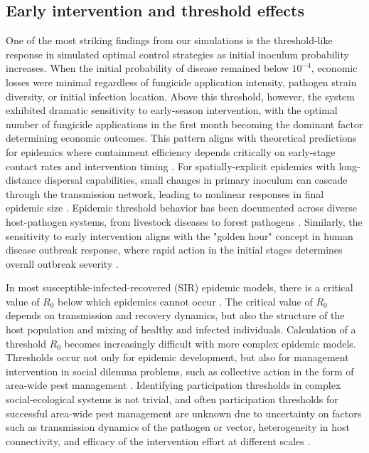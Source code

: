 \documentclass[10pt,a4paper]{article}
\begin{document}
\subsection{Early intervention and threshold effects}

One of the most striking findings from our simulations is the threshold-like response in simulated optimal control strategies as initial inoculum probability increases. When the initial probability of disease remained below $10^{-4}$, economic losses were minimal regardless of fungicide application intensity, pathogen strain diversity, or initial infection location. Above this threshold, however, the system exhibited dramatic sensitivity to early-season intervention, with the optimal number of fungicide applications in the first month becoming the dominant factor determining economic outcomes. This pattern aligns with theoretical predictions for epidemics where containment efficiency depends critically on early-stage contact rates and intervention timing \parencite{Margosian2009, Severns2019}. For spatially-explicit epidemics with long-distance dispersal capabilities, small changes in primary inoculum can cascade through the transmission network, leading to nonlinear responses in final epidemic size \parencite{Cunniffe2015}. Epidemic threshold behavior has been documented across diverse host-pathogen systems, from livestock diseases \parencite{Hartfield2013} to forest pathogens \parencite{Lofgren2014}. Similarly, the sensitivity to early intervention aligns with the "golden hour" concept in human disease outbreak response, where rapid action in the initial stages determines overall outbreak severity \parencite{Fraser2004}.

In most susceptible-infected-recovered (SIR) epidemic models, there is a critical value of $R_0$ below which epidemics cannot occur \parencite{Keeling2007, Diekmann2008}. The critical value of $R_0$ depends on transmission and recovery dynamics, but also the structure of the host population and mixing of healthy and infected individuals. Calculation of a threshold $R_0$ becomes increasingly difficult with more complex epidemic models. Thresholds occur not only for epidemic development, but also for management intervention in social dilemma problems, such as collective action in the form of area-wide pest management \parencite{Lence2022, Garcia-Figuera2024}. Identifying participation thresholds in complex social-ecological systems is not trivial, and often participation thresholds for successful area-wide pest management are unknown due to uncertainty on factors such as transmission dynamics of the pathogen or vector, heterogeneity in host connectivity, and efficacy of the intervention effort at different scales \parencite{Garcia-Figuera2024}.
\end{document}
